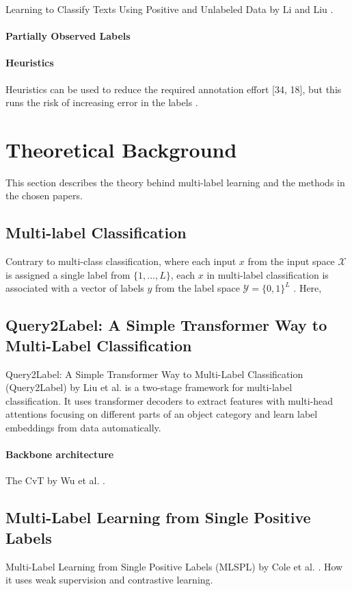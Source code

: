 \documentclass[lettersize,journal]{IEEEtran}
\begin{document}
Learning to Classify Texts Using Positive and Unlabeled Data by Li and Liu \cite{Li_2003}.

\paragraph{Partially Observed Labels}

\paragraph{Heuristics}
Heuristics can be used to reduce the required
annotation effort [34, 18], but this runs the risk of increasing
error in the labels \cite{mlsp}.

\section{Theoretical Background}
This section describes the theory behind multi-label learning and the methods in the chosen papers.

\subsection{Multi-label Classification}
Contrary to multi-class classification, where each input $x$ from the input space $\mathcal{X}$ is assigned a single label from $\{1,...,L\}$, each $x$ in multi-label classification is associated with a vector of labels $y$ from the label space $\mathcal{Y}=\{0,1\}^L$ \cite{mlsp}. Here, 

\subsection{Query2Label: A Simple Transformer Way to Multi-Label Classification}
Query2Label: A Simple Transformer Way to Multi-Label Classification (Query2Label) by Liu et al. \cite{Query2Label} is a two-stage framework for multi-label classification. It uses transformer decoders to extract features with multi-head attentions focusing on different parts of an object category and learn label embeddings from data automatically.

\paragraph{Backbone architecture}
The CvT by Wu et al. \cite{CvT}.

\subsection{Multi-Label Learning from Single Positive Labels}
Multi-Label Learning from Single Positive Labels (MLSPL) by Cole et al. \cite{mlsp}.
How it uses weak supervision and contrastive learning.
\end{document}
